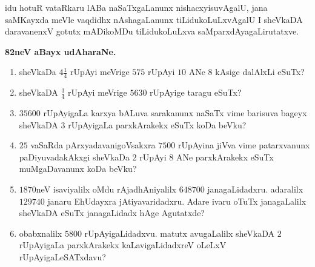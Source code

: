 idu hotuR vataRkaru lABa naSaTxgaLanunx nishacxyisuvAgalU, jana saMKayxda meVle vaqdidhx nAshagaLanunx tiLidu\-koLuLxvAgalU I sheVkaDA daravanenxV gotutx mADikoMDu tiLidukoLuLxva saMparxdAyagaLirutatxve.

\begin{center}
{\bf\large  82neV aBayx udAharaNe.}
\end{center}

\begin{enumerate}[\rm(1)]
\item sheVkaDa $4\tfrac{1}{4}$ rUpAyi meVrige $575$ rUpAyi $10$ ANe $8$ kAsige dalAlxLi eSuTx?

\item sheVkaDA $\tfrac{3}{4}$ rUpAyi meVrige $5630$ rUpAyige taragu eSuTx?

\item $35600$ rUpAyigaLa karxya bALuva sarakanunx naSaTx vime barisuva bageyx sheVkaDA $3$ rUpAyigaLa parxkArakekx eSuTx koDa beVku?

\item $25$ vaSaRda pArxyadavanigoVsakxra $7500$ rUpAyina jiVva vime patarxvanunx paDiyuvadakAkxgi sheVkaDa $2$ rUpAyi $8$ ANe parxkArakekx eSuTx muMgaDavanunx koDa beVku?

\item $1870$neV isaviyalilx oMdu rAjadhAniyalilx $648700$ janagaLidadxru. adaralilx $129740$ janaru EhUdayxra jAtiyavaridadxru. Adare ivaru oTuTx janagaLalilx sheVkaDA eSuTx janagaLidadx hAge Agutatxde?

\item obabxnalilx $5800$ rUpAyigaLidadxvu. matutx avugaLalilx sheVkaDA $2$ rUpAyigaLa parxkArakekx kaLavigaLidadxreV oLeLxV rUpAyigaLeSATxdavu?
\end{enumerate}


